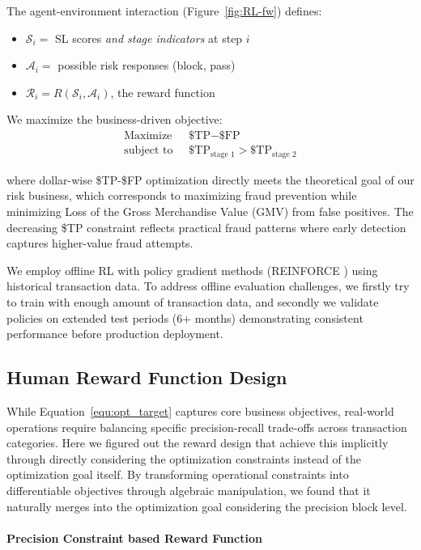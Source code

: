 \documentclass[11pt]{article}
\begin{document}
The agent-environment interaction (Figure~\ref{fig:RL-fw}) defines:
\begin{itemize}
    \item $\mathcal{S}_i =$ SL scores \textit{and stage indicators} at step $i$
    \item $\mathcal{A}_i =$ possible risk responses (block, pass)
    \item $\mathcal{R}_i = R(\mathcal{S}_i,\mathcal{A}_i)$, the reward function
\end{itemize}
We maximize the business-driven objective:
\begin{align}
\label{equ:opt_target}
\text{Maximize } & \; \text{\$TP} - \text{\$FP} \\
\text{subject to } & \; \text{\$TP}_{\text{stage 1}} > \text{\$TP}_{\text{stage 2}} \nonumber
\end{align}

where dollar-wise \$TP-\$FP optimization directly meets the theoretical goal of our risk business, which corresponds to maximizing fraud prevention while minimizing Loss of the Gross Merchandise Value (GMV) from false positives. The decreasing \$TP constraint reflects practical fraud patterns where early detection captures higher-value fraud attempts.

We employ offline RL with policy gradient methods (REINFORCE \cite{williams1992simple}) using historical transaction data. To address offline evaluation challenges, we firstly try to train with enough amount of transaction data, and secondly we validate policies on extended test periods (6+ months) demonstrating consistent performance before production deployment.

\subsection{Human Reward Function Design}

While Equation~\ref{equ:opt_target} captures core business objectives, real-world operations require balancing specific precision-recall trade-offs across transaction categories. Here we figured out the reward design that achieve this implicitly through directly considering the optimization constraints instead of the optimization goal itself. By transforming operational constraints into differentiable objectives through algebraic manipulation, we found that it naturally merges into the optimization goal considering the precision block level.

\paragraph{Precision Constraint based Reward Function}
\end{document}
